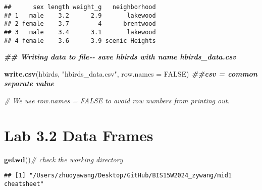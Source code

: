 \documentclass[
]{article}
\newenvironment{Shaded}{\begin{snugshade}}{\end{snugshade}}
\newcommand{\AttributeTok}[1]{\textcolor[rgb]{0.13,0.29,0.53}{#1}}
\newcommand{\CommentTok}[1]{\textcolor[rgb]{0.56,0.35,0.01}{\textit{#1}}}
\newcommand{\ConstantTok}[1]{\textcolor[rgb]{0.56,0.35,0.01}{#1}}
\newcommand{\DocumentationTok}[1]{\textcolor[rgb]{0.56,0.35,0.01}{\textbf{\textit{#1}}}}
\newcommand{\FunctionTok}[1]{\textcolor[rgb]{0.13,0.29,0.53}{\textbf{#1}}}
\newcommand{\NormalTok}[1]{#1}
\newcommand{\StringTok}[1]{\textcolor[rgb]{0.31,0.60,0.02}{#1}}
\begin{document}
\begin{verbatim}
##      sex length weight_g   neighborhood
## 1   male    3.2      2.9       lakewood
## 2 female    3.7        4      brentwood
## 3   male    3.4      3.1       lakewood
## 4 female    3.6      3.9 scenic Heights
\end{verbatim}

\begin{Shaded}
\begin{Highlighting}[]
\DocumentationTok{\#\# Writing data to file{-}{-} save hbirds with name hbirds\_data.csv}

\FunctionTok{write.csv}\NormalTok{(hbirds, }\StringTok{"hbirds\_data.csv"}\NormalTok{, }\AttributeTok{row.names =} \ConstantTok{FALSE}\NormalTok{) }\DocumentationTok{\#\#csv = common separate value}

\CommentTok{\# We use \textasciigrave{}row.names = FALSE\textasciigrave{} to avoid row numbers from printing out. }
\end{Highlighting}
\end{Shaded}

\hypertarget{lab-3.2-data-frames}{%
\section{Lab 3.2 Data Frames}\label{lab-3.2-data-frames}}

\begin{Shaded}
\begin{Highlighting}[]
\FunctionTok{getwd}\NormalTok{()}\CommentTok{\# check the working directory}
\end{Highlighting}
\end{Shaded}

\begin{verbatim}
## [1] "/Users/zhuoyawang/Desktop/GitHub/BIS15W2024_zywang/mid1 cheatsheet"
\end{verbatim}

\begin{Shaded}
\end{Shaded}
\end{document}

